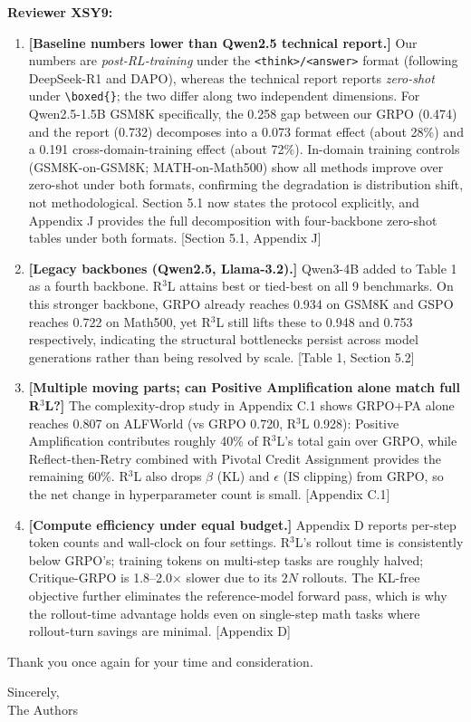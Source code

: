 \documentclass[11pt]{article}
\begin{document}
\noindent \textbf{Reviewer XSY9:}
\begin{enumerate}[label=(\arabic*), itemsep=2pt]
    \item \textbf{[Baseline numbers lower than Qwen2.5 technical report.]} Our numbers are \emph{post-RL-training} under the \texttt{<think>/<answer>} format (following DeepSeek-R1 and DAPO), whereas the technical report reports \emph{zero-shot} under \texttt{\textbackslash boxed\{\}}; the two differ along two independent dimensions. For Qwen2.5-1.5B GSM8K specifically, the 0.258 gap between our GRPO (0.474) and the report (0.732) decomposes into a 0.073 format effect (about 28\%) and a 0.191 cross-domain-training effect (about 72\%). In-domain training controls (GSM8K-on-GSM8K; MATH-on-Math500) show all methods improve over zero-shot under both formats, confirming the degradation is distribution shift, not methodological. Section 5.1 now states the protocol explicitly, and Appendix J provides the full decomposition with four-backbone zero-shot tables under both formats. [Section 5.1, Appendix J]

    \item \textbf{[Legacy backbones (Qwen2.5, Llama-3.2).]} Qwen3-4B added to Table 1 as a fourth backbone. R$^3$L attains best or tied-best on all 9 benchmarks. On this stronger backbone, GRPO already reaches 0.934 on GSM8K and GSPO reaches 0.722 on Math500, yet R$^3$L still lifts these to 0.948 and 0.753 respectively, indicating the structural bottlenecks persist across model generations rather than being resolved by scale. [Table 1, Section 5.2]

    \item \textbf{[Multiple moving parts; can Positive Amplification alone match full R$^3$L?]} The complexity-drop study in Appendix C.1 shows GRPO+PA alone reaches 0.807 on ALFWorld (vs GRPO 0.720, R$^3$L 0.928): Positive Amplification contributes roughly 40\% of R$^3$L's total gain over GRPO, while Reflect-then-Retry combined with Pivotal Credit Assignment provides the remaining 60\%. R$^3$L also drops $\beta$ (KL) and $\epsilon$ (IS clipping) from GRPO, so the net change in hyperparameter count is small. [Appendix C.1]

    \item \textbf{[Compute efficiency under equal budget.]} Appendix D reports per-step token counts and wall-clock on four settings. R$^3$L's rollout time is consistently below GRPO's; training tokens on multi-step tasks are roughly halved; Critique-GRPO is 1.8--2.0$\times$ slower due to its $2N$ rollouts. The KL-free objective further eliminates the reference-model forward pass, which is why the rollout-time advantage holds even on single-step math tasks where rollout-turn savings are minimal. [Appendix D]
\end{enumerate}

\vspace{0.1in}
\noindent Thank you once again for your time and consideration.

\vspace{0.1in}
\noindent Sincerely,\\
The Authors
\end{document}

